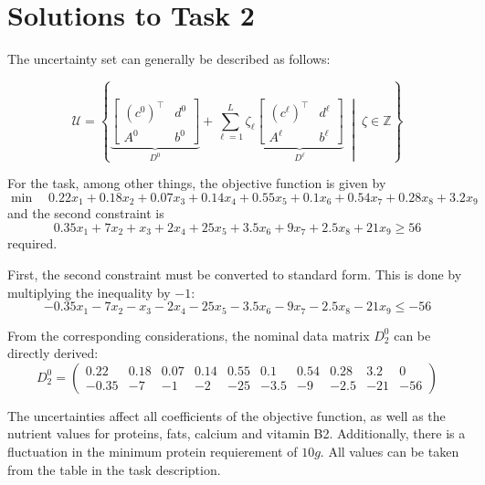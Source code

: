 \documentclass[a4paper,12pt]{article}
\begin{document}
\newpage

\section*{Solutions to Task 2}

The uncertainty set can generally be described as follows:

\[
\mathcal{U} = \left\{
\underbrace{
\left[
\begin{array}{c|c}
(c^0)^\top & d^0 \\ \hline
A^0 & b^0
\end{array}
\right]
}_{D^0}
+ \sum_{\ell=1}^L \zeta_\ell
\underbrace{
\left[
\begin{array}{c|c}
(c^\ell)^\top & d^\ell \\ \hline
A^\ell & b^\ell
\end{array}
\right]
}_{D^\ell}
\;\middle|\; \zeta \in \mathbb{Z}
\right\}
\]

For the task, among other things, the objective function is given by
\[
    \min \quad 0.22x_1 + 0.18x_2 + 0.07x_3 + 0.14x_4 + 0.55x_5 + 0.1x_6 + 0.54x_7 + 0.28x_8 + 3.2x_9
\]
and the second constraint is
\[
0.35x_1 + 7x_2 + x_3 + 2x_4 + 25x_5 + 3.5x_6 + 9x_7 + 2.5x_8 + 21x_9 \geq 56
\]
required.

First, the second constraint must be converted to standard form. This is done by multiplying the inequality by $-1$:
\[
    -0.35x_1  -7x_2  -x_3  -2x_4 - 25x_5 - 3.5x_6 - 9x_7 - 2.5x_8 - 21x_9 \leq -56
\]

From the corresponding considerations, the nominal data matrix $D^0_2$ can be directly derived: 
\[
    D^0_2 = \begin{pmatrix}
        0.22 & 0.18 & 0.07 & 0.14 & 0.55 & 0.1 & 0.54 & 0.28 & 3.2 & 0 \\
        -0.35 & -7 & -1 & -2 & -25 & -3.5 & -9 & -2.5 & -21 & -56
    \end{pmatrix}
\]
        
The uncertainties affect all coefficients of the objective function, as well as the nutrient values for proteins, fats, calcium and vitamin B2. Additionally, there is a fluctuation in the minimum protein requierement of $10g$. All values can be taken from the table in the task description.
\end{document}
